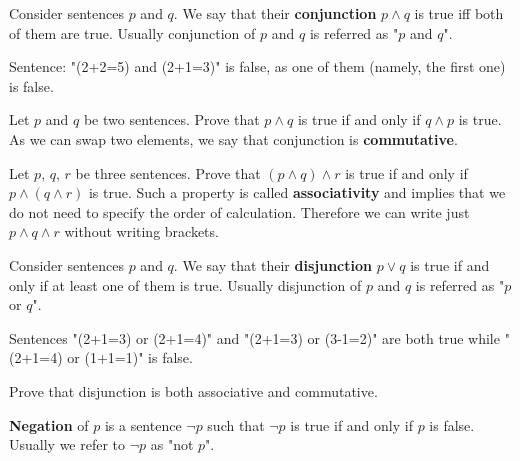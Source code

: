 \begin{definition}
  Consider sentences $p$ and $q$. We say that their \textbf{conjunction} $p\wedge q$ is true iff both of them are true. Usually conjunction of $p$ and $q$ is
  referred as "$p$ and $q$".
\end{definition}

\begin{example}
  Sentence: "(2+2=5) and (2+1=3)" is false, as one of them (namely, the first one) is false.
\end{example}

\begin{exercise}
  Let $p$ and $q$ be two sentences. Prove that $p\wedge q$ is true if and only if $q\wedge p$ is true. As we can swap two elements, we say that conjunction is \textbf{commutative}.
\end{exercise}

\begin{exercise}
  Let $p,\, q,\, r$ be three sentences. Prove that $(p\wedge q)\wedge r$ is true if and only if $p\wedge (q\wedge r)$ is true. Such a property is called \textbf{associativity}
  and implies that we do not need to specify the order of calculation. Therefore we can write just $p\wedge q\wedge r$ without writing brackets.
\end{exercise}

\begin{definition}
  Consider sentences $p$ and $q$. We say that their \textbf{disjunction} $p\vee q$ is true if and only if at least one of them is true. Usually disjunction of $p$ and $q$ is
  referred as "$p$ or $q$".
\end{definition}

\begin{example}
  Sentences "(2+1=3) or (2+1=4)" and "(2+1=3) or (3-1=2)" are both true while "(2+1=4) or (1+1=1)" is false.
\end{example}

\begin{exercise}
  Prove that disjunction is both associative and commutative.
\end{exercise}

\begin{definition}
  \textbf{Negation} of $p$ is a sentence $\neg p$ such that $\neg p$ is true if and only if $p$ is false. Usually we refer to $\neg p$ as "not $p$".
\end{definition}

